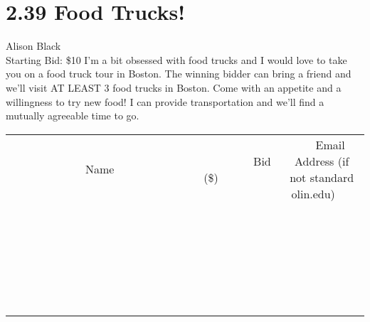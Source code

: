 \documentclass[11pt]{article}
\begin{document}
\section*{2.39 Food Trucks!}
Alison Black
\\
Starting Bid: \$10
\newline
I'm a bit obsessed with food trucks and I would love to take you on a food truck tour in Boston.  The winning bidder can bring a friend and we'll visit AT LEAST 3 food trucks in Boston.  Come with an appetite and a willingness to try new food!  I can provide transportation and we'll find a mutually agreeable time to go.
\\[6ex]
\begin{tabular}{c c c}
~~~~~~~~~~~~~Name~~~~~~~~~~~~~ & ~~~~~~~~~Bid (\$)~~~~~~~~~  & ~~~Email Address (if not standard olin.edu)~~~\\
 & & \\
\hline
 & & \\
\hline
 & & \\
\hline
 & & \\
\hline
 & & \\
\hline
 & & \\
\hline
 & & \\
\hline
 & & \\
\hline
 & & \\
\hline
 & & \\
\hline
 & & \\
\hline
 & & \\
\hline
 & & \\
\hline
 & & \\
\hline
 & & \\
\hline
 & & \\
\hline
 & & \\
\hline
 & & \\
\hline
 & & \\
\hline
 & & \\
\hline
 & & \\
\hline
 & & \\
\hline
 & & \\
\hline
 & & \\
\hline
 & & \\
\hline
 & & \\
\hline
\end{tabular}
\newpage
\end{document}
